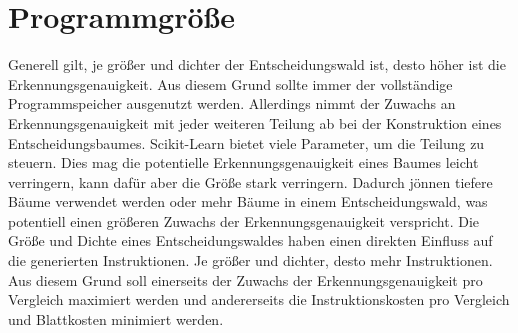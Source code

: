 \section{Programmgröße}
\label{sec:eval_size}
Generell gilt, je größer und dichter der Entscheidungswald ist, desto höher ist die Erkennungsgenauigkeit. Aus diesem Grund sollte immer der vollständige Programmspeicher ausgenutzt werden. Allerdings nimmt der
Zuwachs an Erkennungsgenauigkeit mit jeder weiteren Teilung ab bei der Konstruktion eines Entscheidungsbaumes.
\newline
\newline
Scikit-Learn bietet viele Parameter, um die Teilung zu steuern. Dies mag die potentielle
Erkennungsgenauigkeit eines Baumes leicht verringern, kann dafür aber die Größe stark verringern. Dadurch jönnen tiefere Bäume verwendet werden oder mehr Bäume in einem Entscheidungswald, was potentiell
einen größeren Zuwachs der Erkennungsgenauigkeit verspricht.
\newline
\newline
Die Größe und Dichte eines Entscheidungswaldes haben einen direkten Einfluss auf die generierten Instruktionen. Je größer und dichter, desto mehr Instruktionen. Aus diesem Grund soll einerseits der
Zuwachs der Erkennungsgenauigkeit pro Vergleich maximiert werden und andererseits die Instruktionskosten pro Vergleich und Blattkosten minimiert werden.




